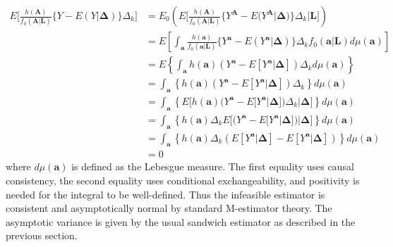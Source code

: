 \documentclass[12pt]{article}
\begin{document}
\begin{align*}
E \bigg[\frac{h(\bm{A})}{f_{0}(\bm{A} | \bm{L})} \{ Y - E(Y | \bm{\Delta})\} \Delta_{k} \bigg] &= E_{0} \left( E \bigg[\frac{h(\bm{A})}{f_{0}(\bm{A} | \bm{L})} \{ Y^{\bm{A}} - E(Y^{\bm{A}} | \bm{\Delta}) \} \Delta_{k} | \bm{L} \bigg] \right) \\
&= E \left [ \int_{\bm{a}} \frac{h(\bm{a})}{f_{0}(\bm{a} | \bm{L})}\{ Y^{\bm{a}} - E(Y^{\bm{a}} | \bm{\Delta}) \} \Delta_{k} f_{0}(\bm{a} | \bm{L}) d\mu (\bm{a}) \right ] \\
&= E \left \{ \int_{\bm{a}} h(\bm{a})(Y^{\bm{a}} - E[Y^{\bm{a}} | \bm{\Delta}])\Delta_{k} d\mu (\bm{a}) \right \} \\
&= \int_{\bm{a}} \left \{ h(\bm{a})(Y^{\bm{a}} - E[Y^{\bm{a}} | \bm{\Delta}])\Delta_{k} \right \} d\mu (\bm{a}) \\
&= \int_{\bm{a}} \left \{ E \bigg[ h(\bm{a})(Y^{\bm{a}} - E[Y^{\bm{a}} | \bm{\Delta}])\Delta_{k} | \bm{\Delta} \bigg] \right \} d\mu (\bm{a}) \\
&= \int_{\bm{a}} \left \{ h(\bm{a})\Delta_{k} E \bigg[ (Y^{\bm{a}} - E[Y^{\bm{a}} | \bm{\Delta}]) | \bm{\Delta} \bigg] \right \} d\mu (\bm{a}) \\
&= \int_{\bm{a}} \left \{ h(\bm{a})\Delta_{k} ( E[Y^{\bm{a}} | \bm{\Delta}] - E[Y^{\bm{a}} | \bm{\Delta}] ) \right \} d\mu (\bm{a}) \\
&= 0
\end{align*}
where $d\mu (\bm{a})$ is defined as the Lebesgue measure. The first equality uses causal consistency, the second equality uses conditional exchangeability, and positivity is needed for the integral to be well-defined. Thus the infeasible estimator is consistent and asymptotically normal by standard M-estimator theory. The asymptotic variance is given by the usual sandwich estimator as described in the previous section.
\end{document}
